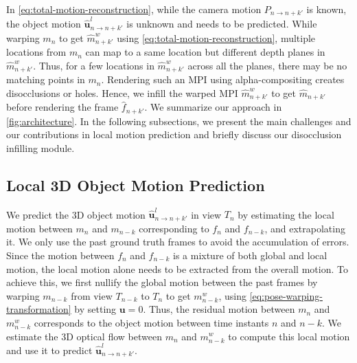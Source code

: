 \documentclass[preprint]{vgtc}
\begin{document}
    In \autoref{eq:total-motion-reconstruction}, while the camera motion $P_{n \rightarrow n+k'}$ is known, the object motion $\hat{\mathbf{u}}^l_{n \rightarrow n+k'}$ is unknown and needs to be predicted.
    While warping $m_n$ to get $\hat{m}^w_{n+k'}$ using \autoref{eq:total-motion-reconstruction}, multiple locations from $m_n$ can map to a same location but different depth planes in $\hat{m}^w_{n+k'}$.
    Thus, for a few locations in $\hat{m}^w_{n+k'}$ across all the planes, there may be no matching points in $m_n$.
    Rendering such an MPI using alpha-compositing creates disocclusions or holes.
    Hence, we infill the warped MPI $\hat{m}^w_{n + k'}$ to get $\hat{m}_{n + k'}$ before rendering the frame $\hat{f}_{n+k'}$.
    We summarize our approach in \autoref{fig:architecture}.
In the following subsections, we present the main challenges and our contributions in local motion prediction and briefly discuss our disocclusion infilling module.



    \subsection{Local 3D Object Motion Prediction}\label{subsec:local-object-motion-prediction}


    We predict the 3D object motion $\hat{\mathbf{u}}^l_{n \rightarrow n+k'}$ in view $T_n$ by estimating the local motion between $m_n$ and $m_{n-k}$ corresponding to $f_n$ and $f_{n-k}$, and extrapolating it.
    We only use the past ground truth frames to avoid the accumulation of errors.
    Since the motion between $f_n$ and $f_{n-k}$ is a mixture of both global and local motion, the local motion alone needs to be extracted from the overall motion.
    To achieve this, we first nullify the global motion between the past frames by warping $m_{n-k}$ from view $T_{n-k}$ to $T_n$ to get $m^w_{n-k}$, using \autoref{eq:pose-warping-transformation} by setting $\mathbf{u}=0$.
Thus, the residual motion between $m_n$ and $m^w_{n-k}$ corresponds to the object motion between time instants $n$ and $n-k$.
    We estimate the 3D optical flow between $m_n$ and $m^w_{n-k}$ to compute this local motion and use it to predict $\hat{\mathbf{u}}^l_{n \rightarrow n+k'}$.
\end{document}
